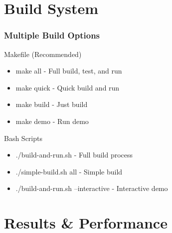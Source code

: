 \documentclass[aspectratio=169]{beamer}
\begin{document}
\section{Build System}

\begin{frame}
    \frametitle{Multiple Build Options}
    \begin{block}{Makefile (Recommended)}
        \begin{itemize}
            \item make all - Full build, test, and run
            \item make quick - Quick build and run
            \item make build - Just build
            \item make demo - Run demo
        \end{itemize}
    \end{block}
    
    \begin{block}{Bash Scripts}
        \begin{itemize}
            \item ./build-and-run.sh - Full build process
            \item ./simple-build.sh all - Simple build
            \item ./build-and-run.sh --interactive - Interactive demo
        \end{itemize}
    \end{block}
\end{frame}

\section{Results \& Performance}
\end{document}

